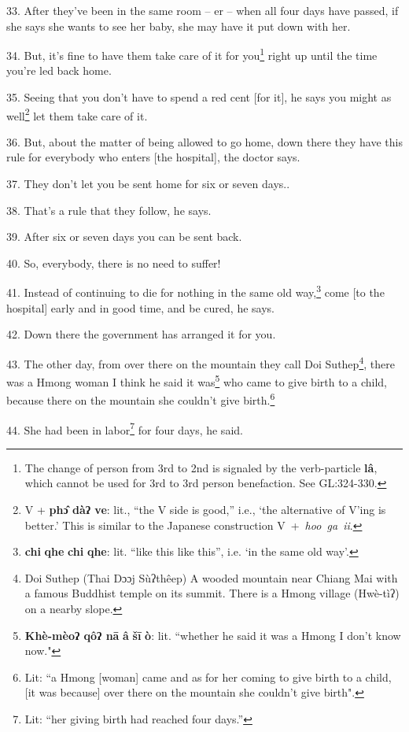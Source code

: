 33. After they've been in the same room -- er -- when all four days have passed,
if she says she wants to see her baby, she may have it put down with her.

34. But, it's fine to have them take care of it for you\footnote{The change of person from 3rd to 2nd is signaled by the verb-particle \textbf{lâ}, which cannot be used for 3rd to 3rd person benefaction. See GL:324-330.} right up until the
time you're led back home.

35. Seeing that you don't have to spend a red cent [for it], he says you might
as well\footnote{V + \textbf{phɔ̂ dàʔ ve}: lit., ``the V side is good,'' i.e., `the alternative of V'ing is better.' This is similar to the Japanese construction V~+~\textit{hoo~ga~ii}.} let them take care of it.

36. But, about the matter of being allowed to go home, down there they have this
rule for everybody who enters [the hospital], the doctor says.

37. They don't let you be sent home for six or seven days..

38. That's a rule that they follow, he says.

39. After six or seven days you can be sent back.

40. So, everybody, there is no need to suffer!

41. Instead of continuing to die for nothing in the same old way,\footnote{\textbf{chi} \textbf{qhe} \textbf{chi} \textbf{qhe}: lit. ``like this like this'', i.e. `in the same old way'.} come [to
the hospital] early and in good time, and be cured, he says.

42. Down there the government has arranged it for you.

43. The other day, from over there on the mountain they call Doi Suthep\footnote{Doi Suthep (Thai Dɔɔj Sùʔthêep) A wooded mountain near Chiang Mai with a famous Buddhist temple on its summit. There is a Hmong village (Hwè-tìʔ) on a nearby slope.}, there
was a Hmong woman I think he said it was\footnote{\textbf{Khè-mèoʔ qôʔ nā} \textbf{â} \textbf{šī} \textbf{ò}: lit. ``whether he said it was a Hmong I don't know now."} who came to give birth to a child,
because there on the mountain she couldn't give birth.\footnote{Lit: ``a Hmong [woman] came and as for her coming to give birth to a child, [it was because] over there on the mountain she couldn't give birth".}

44. She had been in labor\footnote{Lit: ``her giving birth had reached four days.''} for four days, he said.

